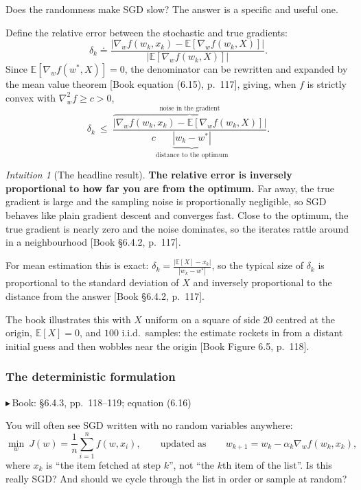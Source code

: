 \documentclass[11pt, letterpaper]{article}
\theoremstyle{runin}
\theoremstyle{runinplain}
\theoremstyle{remark}
\newtheorem*{intuition}{Intuition}
\newcommand{\E}{\mathbb{E}}
\newcommand{\abs}[1]{\left\lvert #1 \right\rvert}
\newcommand{\bk}[1]{{\color{bookblue}\small$\blacktriangleright$\,\textsf{Book: #1}}}
\newcommand{\bkin}[1]{{\color{bookblue}\small[\textsf{Book #1}]}}
\begin{document}
Does the randomness make SGD slow? The answer is a specific and useful one.

Define the relative error between the stochastic and true gradients:
\[
  \delta_k\doteq\frac{\abs{\nabla_wf(w_k,x_k)-\E[\nabla_wf(w_k,X)]}}
                     {\abs{\E[\nabla_wf(w_k,X)]}} .
\]
Since $\E[\nabla_wf(w^*,X)]=0$, the denominator can be rewritten and expanded by
the mean value theorem \bkin{equation (6.15), p.~117}, giving, when $f$ is strictly
convex with $\nabla^2_wf\ge c>0$,
\[
  \delta_k\ \le\
  \frac{\overbrace{\abs{\nabla_wf(w_k,x_k)-\E[\nabla_wf(w_k,X)]}}^{\text{noise in the gradient}}}
       {c\underbrace{\abs{w_k-w^*}}_{\text{distance to the optimum}}} .
\]

\begin{intuition}[The headline result]
\textbf{The relative error is inversely proportional to how far you are from the
optimum.} Far away, the true gradient is large and the sampling noise is
proportionally negligible, so SGD behaves like plain gradient descent and converges
fast. Close to the optimum, the true gradient is nearly zero and the noise
dominates, so the iterates rattle around in a neighbourhood
\bkin{\S6.4.2, p.~117}.

For mean estimation this is exact:
$\delta_k=\frac{\abs{\E[X]-x_k}}{\abs{w_k-w^*}}$, so the typical size of $\delta_k$
is proportional to the standard deviation of $X$ and inversely proportional to the
distance from the answer \bkin{\S6.4.2, p.~117}.
\end{intuition}

The book illustrates this with $X$ uniform on a square of side $20$ centred at the
origin, $\E[X]=0$, and $100$ i.i.d.\ samples: the estimate rockets in from a distant
initial guess and then wobbles near the origin \bkin{Figure 6.5, p.~118}.

\subsubsection{The deterministic formulation}

\bk{\S6.4.3, pp.~118--119; equation (6.16)}

You will often see SGD written with no random variables anywhere:
\[
  \min_w\ J(w)=\frac1n\sum_{i=1}^n f(w,x_i),
  \qquad\text{updated as}\qquad
  w_{k+1}=w_k-\alpha_k\nabla_wf(w_k,x_k),
  \tag{6.16}
\]
where $x_k$ is ``the item fetched at step $k$'', not ``the $k$th item of the list''.
Is this really SGD? And should we cycle through the list in order or sample at
random?
\end{document}
